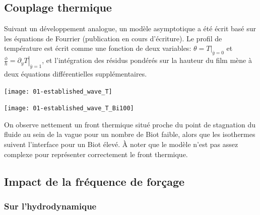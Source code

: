 \documentclass[a0,portrait]{a0poster}
\begin{document}
\begin{multicols}{2}
    \subsection*{Couplage thermique}
    Suivant un développement analogue, un modèle asymptotique a été écrit basé sur les équations de Fourrier (publication en cours d'écriture). Le profil de température est écrit comme une fonction de deux variables: $\theta = T|_{\bar{y}=0}$ et $\frac{\phi}{h} = \left.\partial_{y}T\right|_{\bar{y}=1}$, et l'intégration des résidus pondérés sur la hauteur du film mène à deux équations différentielles supplémentaires.

    \begin{multicols}{2}
        \begin{center}
            \texttt{[image: 01-established\_wave\_T]}
            \label{fig:thermal}
        \end{center}
        \columnbreak
        \begin{center}
            \texttt{[image: 01-established\_wave\_T\_Bi100]}
            \label{fig:thermal_Bi100}
        \end{center}
    \end{multicols}

    On observe nettement un front thermique situé proche du point de stagnation du fluide au sein de la vague pour un nombre de Biot faible, alors que les isothermes suivent l'interface pour un Biot élevé. À noter que le modèle n'est pas assez complexe pour représenter correctement le front thermique.

    \columnbreak

    \subsection*{Impact de la fréquence de forçage}

    \begin{multicols}{2}
        \subsubsection*{Sur l'hydrodynamique}


\end{multicols}
\end{multicols}
\end{document}
